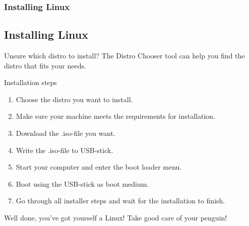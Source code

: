 \begin{frame}
	\frametitle{Installing Linux}
	\subsection{Installing Linux}
	
	\begin{alertblock}{Unsure which distro to install?}
		The Distro Chooser\cite{distrochooser} tool can help you find the distro that fits your needs.
	\end{alertblock}

	\vfill

	\begin{block}{Installation steps}
		\begin{enumerate}
			\item Choose the distro you want to install.
			\item Make sure your machine meets the requirements for installation.
			\item Download the .iso-file you want.
			\item Write the .iso-file to USB-stick.
			\item Start your computer and enter the boot loader menu.
			\item Boot using the USB-stick as boot medium.
			\item Go through all installer steps and wait for the installation to finish.
		\end{enumerate}
	\end{block}

	\vfill
	
	\begin{exampleblock}{Well done, you've got yourself a Linux!}
		Take good care of your penguin!
	\end{exampleblock}
	
\end{frame}
